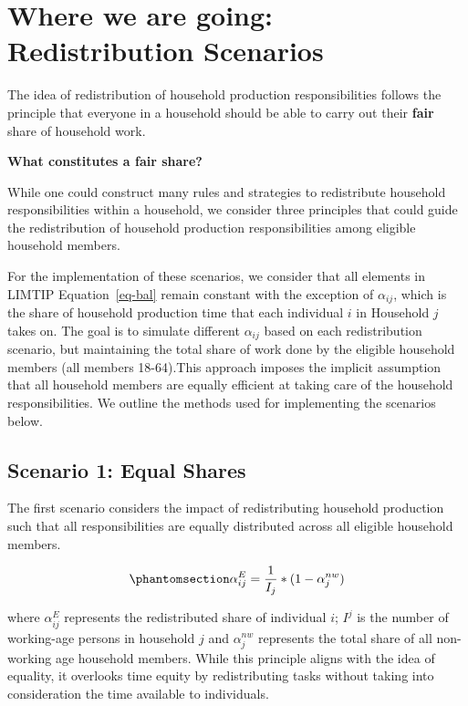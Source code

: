 \documentclass[
  11pt,
]{article}
\begin{document}
\section{Where we are going: Redistribution
Scenarios}\label{where-we-are-going-redistribution-scenarios}

The idea of redistribution of household production responsibilities
follows the principle that everyone in a household should be able to
carry out their \textbf{fair} share of household work.

\textbf{What constitutes a fair share?}

While one could construct many rules and strategies to redistribute
household responsibilities within a household, we consider three
principles that could guide the redistribution of household production
responsibilities among eligible household members.

For the implementation of these scenarios, we consider that all elements
in LIMTIP Equation~\ref{eq-bal} remain constant with the exception of
\(\alpha_{ij}\), which is the share of household production time that
each individual \(i\) in Household \(j\) takes on. The goal is to
simulate different \(\alpha_{ij}\) based on each redistribution
scenario, but maintaining the total share of work done by the eligible
household members (all members 18-64).This approach imposes the implicit
assumption that all household members are equally efficient at taking
care of the household responsibilities. We outline the methods used for
implementing the scenarios below.

\subsection{Scenario 1: Equal Shares}\label{scenario-1-equal-shares}

The first scenario considers the impact of redistributing household
production such that all responsibilities are equally distributed across
all eligible household members.

\begin{equation}\phantomsection\label{eq-r1}{\alpha_{ij}^E= \frac{1}{I_j}*(1-\alpha_{j}^{nw})
}\end{equation}

where \(\alpha_{ij}^E\) represents the redistributed share of individual
\(i\); \(I^j\) is the number of working-age persons in household \(j\)
and \(\alpha_{j}^{nw}\) represents the total share of all non-working
age household members. While this principle aligns with the idea of
equality, it overlooks time equity by redistributing tasks without
taking into consideration the time available to individuals.
\end{document}
